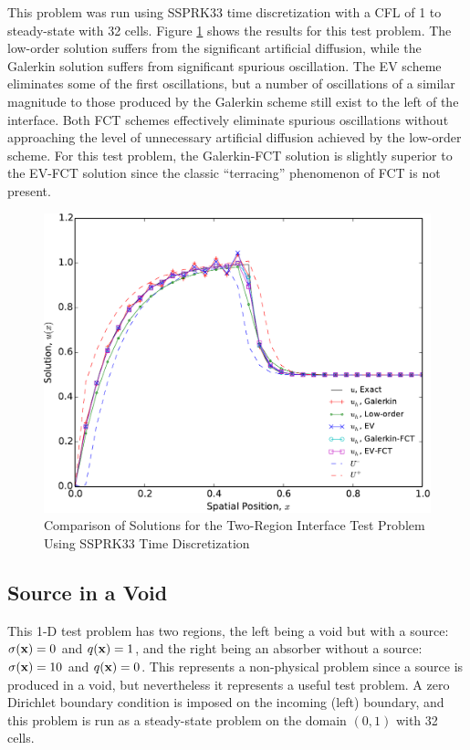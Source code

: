 This problem was run using SSPRK33 time discretization with a CFL of 1 to
steady-state with 32 cells. Figure \ref{fig:interface} shows the results
for this test problem. The low-order solution suffers from the significant
artificial diffusion, while the Galerkin solution suffers from significant
spurious oscillation. The EV scheme eliminates some of the first oscillations,
but a number of oscillations of a similar magnitude to those produced by
the Galerkin scheme still exist to the left of the interface. Both FCT
schemes effectively eliminate spurious oscillations without approaching
the level of unnecessary artificial diffusion achieved by the low-order
scheme. For this test problem, the Galerkin-FCT solution is slightly
superior to the EV-FCT solution since the classic ``terracing'' phenomenon
of FCT is not present.

\begin{figure}[htb]
   \centering
      \includegraphics[width=\textwidth]
        {images/solution_interface.pdf}
      \caption{Comparison of Solutions for the Two-Region Interface Test
       Problem Using SSPRK33 Time Discretization}
   \label{fig:interface}
\end{figure}
\clearpage
\subsection{Source in a Void}
This 1-D test problem has two regions, the left being a void but with a source:
$\sigma(\mathbf{x})=0$ and $q(\mathbf{x})=1$, and the right being an absorber without a source:
$\sigma(\mathbf{x})=10$ and $q(\mathbf{x})=0$. This represents a non-physical problem since
a source is produced in a void, but nevertheless it represents a useful test
problem. A zero Dirichlet boundary condition is imposed on the incoming (left)
boundary, and this problem is run as a steady-state problem on the domain
$(0,1)$ with 32 cells.

